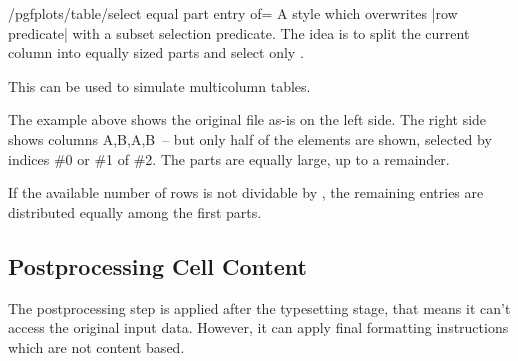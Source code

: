 \begin{stylekey}{/pgfplots/table/select equal part entry of=}
	A style which overwrites |row predicate| with a subset selection predicate. The idea is to split the current column into  equally sized parts and select only .

	This can be used to simulate multicolumn tables.
\begin{codeexample}[]


\end{codeexample}
	The example above shows the original file as-is on the left side. The right side shows columns A,B,A,B~-- but only half of the elements are shown, selected by indices \#0 or \#1 of \#2. The parts are equally large, up to a remainder. 
	
	If the available number of rows is not dividable by , the remaining entries are distributed equally among the first parts.
\end{stylekey}


\subsection{Postprocessing Cell Content}
The postprocessing step is applied after the typesetting stage, that means it can't access the original input data. However, it can apply final formatting instructions which are not content based.

